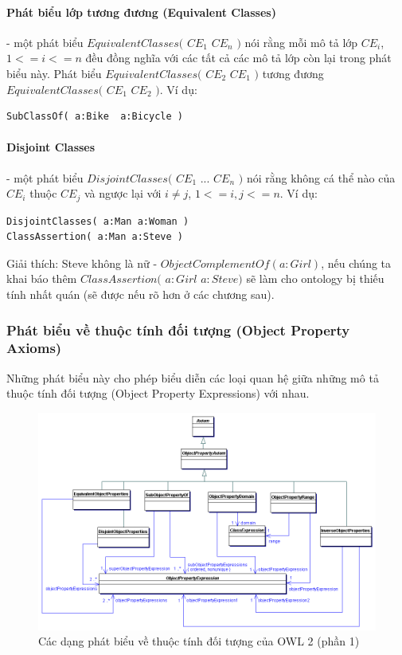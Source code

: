 \paragraph{Phát biểu lớp tương đương (Equivalent Classes)} - một phát biểu $EquivalentClasses($ $CE_{1}$ $CE_{n}$ $)$ nói rằng mỗi mô tả lớp $CE_{i}$, $1<=i<=n$ đều đồng nghĩa với các tất cả các mô tả lớp còn lại trong phát biểu này. Phát biểu $EquivalentClasses($ $CE_{2}$ $CE_{1}$ $)$ tương đương $EquivalentClasses($ $CE_{1}$ $CE_{2}$ $)$. Ví dụ:
\begin{verbatim}
SubClassOf( a:Bike  a:Bicycle )
\end{verbatim}

\paragraph{Disjoint Classes} - một phát biểu $DisjointClasses($ $CE_{1}$ ... $CE_{n}$ $)$ nói rằng không cá thể nào của $CE_{i}$ thuộc $CE_{j}$ và ngược lại với $i \neq j$, $1<=i,j<=n$. Ví dụ:
\begin{verbatim}
DisjointClasses( a:Man a:Woman )	
ClassAssertion( a:Man a:Steve )
\end{verbatim}
Giải thích: Steve không là nữ - $ObjectComplementOf( a:Girl )$, nếu chúng ta khai báo thêm $ClassAssertion($ $a:Girl$ $a:Steve)$ sẽ làm cho ontology bị thiếu tính nhất quán (sẽ được nếu rõ hơn ở các chương sau).

\subsubsection{Phát biểu về thuộc tính đối tượng (Object Property Axioms)}
Những phát biểu này cho phép biểu diễn các loại quan hệ giữa những mô tả thuộc tính đối tượng (Object Property Expressions) với nhau.
\begin{figure}[h]
	\centering
	\includegraphics[width=120mm]{Figures/objectpropertyAxiom.png}
	\caption{Các dạng phát biểu về thuộc tính đối tượng của OWL 2 (phần 1)\label{overflow}}
\end{figure}

